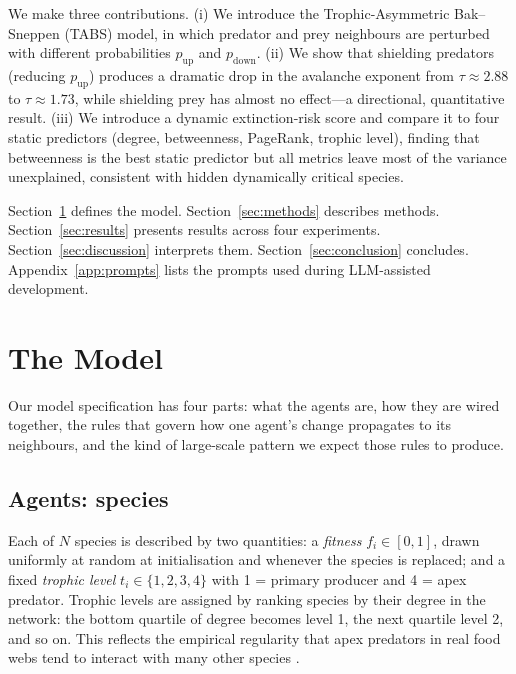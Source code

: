 \documentclass[10pt,a4paper,twocolumn]{article}
\begin{document}
We make three contributions. (i) We introduce the Trophic-Asymmetric Bak--Sneppen (TABS) model, in which predator and prey neighbours are perturbed with different probabilities $p_{\text{up}}$ and $p_{\text{down}}$. (ii) We show that shielding predators (reducing $p_{\text{up}}$) produces a dramatic drop in the avalanche exponent from $\tau \approx 2.88$ to $\tau \approx 1.73$, while shielding prey has almost no effect---a directional, quantitative result. (iii) We introduce a dynamic extinction-risk score and compare it to four static predictors (degree, betweenness, PageRank, trophic level), finding that betweenness is the best static predictor but all metrics leave most of the variance unexplained, consistent with hidden dynamically critical species.

Section~\ref{sec:model} defines the model. Section~\ref{sec:methods} describes methods. Section~\ref{sec:results} presents results across four experiments. Section~\ref{sec:discussion} interprets them. Section~\ref{sec:conclusion} concludes. Appendix~\ref{app:prompts} lists the prompts used during LLM-assisted development.

\section{The Model}\label{sec:model}
Our model specification has four parts: what the agents are, how they are wired together, the rules that govern how one agent's change propagates to its neighbours, and the kind of large-scale pattern we expect those rules to produce.

\subsection{Agents: species}
Each of $N$ species is described by two quantities: a \emph{fitness} $f_i \in [0,1]$, drawn uniformly at random at initialisation and whenever the species is replaced; and a fixed \emph{trophic level} $t_i \in \{1,2,3,4\}$ with 1 = primary producer and 4 = apex predator. Trophic levels are assigned by ranking species by their degree in the network: the bottom quartile of degree becomes level 1, the next quartile level 2, and so on. This reflects the empirical regularity that apex predators in real food webs tend to interact with many other species \citep{dunne2002foodweb}.
\end{document}
